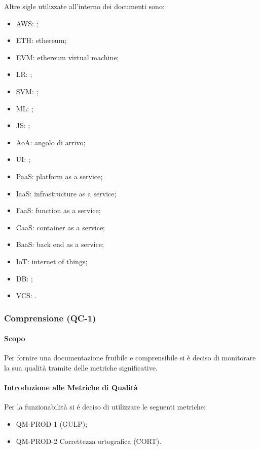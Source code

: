 				Altre sigle utilizzate all'interno dei documenti sono:
				\begin{itemize}
					\item AWS: ;
					\item ETH: ethereum;
					\item EVM: ethereum virtual machine;
					\item LR: ;
					\item SVM: ;
					\item ML: ;
					\item JS: ;
					\item AoA: angolo di arrivo;
					\item UI: ;
					\item PaaS: platform as a service;
					\item IaaS: infrastructure as a service;
					\item FaaS: function as a service;
					\item CaaS: container as a service;
					\item BaaS: back end as a service;
					\item IoT: internet of things;
					\item DB: ;
					\item VCS: .
				\end{itemize}
		\subsubsection{Comprensione (QC-1)}
				\paragraph{Scopo}
					Per fornire una documentazione fruibile e comprensibile si è deciso di monitorare la sua qualità tramite delle metriche significative.
				\paragraph{Introduzione alle Metriche di Qualità}
					Per la funzionabilità si é deciso di utilizzare le seguenti metriche:
					\begin{itemize}
						\item QM-PROD-1  (GULP);
						\item QM-PROD-2 Correttezza ortografica (CORT).
					\end{itemize}
